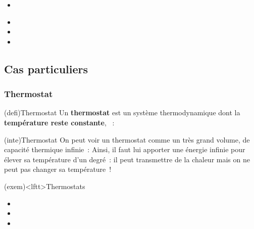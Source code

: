\documentclass[../../main/main.tex]{subfiles}
\begin{document}
\begin{tcb}
\begin{minipage}[t]{.31\linewidth}
\begin{itemize}
			\item {}
		\end{itemize}
	\end{minipage}
	\hspace*{\fill}
	\begin{minipage}[t]{.31\linewidth}
		\begin{itemize}
			\item {}
			\item {}
			\item {}
		\end{itemize}
	\end{minipage}
\end{tcb}

\subsection{Cas particuliers}
\subsubsection{Thermostat}
\begin{tcb*}(defi){Thermostat}
	Un \textbf{thermostat} est un système thermodynamique dont la
	\textbf{température reste constante}, ~:
	\psw{%
		\[
			\boxed{T\ind{thermostat} = \cte}
		\]
	}%
	\vspace{-15pt}
\end{tcb*}

\begin{tcb}(inte){Thermostat}
	On peut voir un thermostat comme un très grand volume, de capacité thermique
	infinie~:
	\psw{%
		\[
			\boxed{C_{V}\sup{thermostat} = +\infty}
		\]
	}%
	Ainsi, il faut lui apporter une énergie infinie pour élever sa température
	d'un degré~: il peut transmettre de la chaleur mais on ne peut pas changer sa
	température~!
\end{tcb}

\begin{tcb}(exem)<lftt>{Thermostats}
	\begin{itemize}
		\item {}
		\item {}
		\item {}
	\end{itemize}
\end{tcb}
\end{document}
